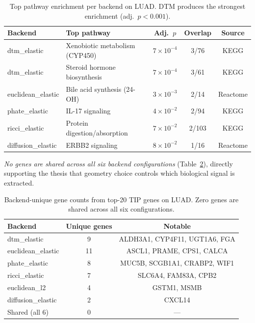 \documentclass[12pt]{article}
\begin{document}
\begin{table}[h]
\centering\small
\begin{tabular}{@{}llccc@{}}
\toprule
\textbf{Backend} & \textbf{Top pathway} & \textbf{Adj.\ $p$} & \textbf{Overlap} & \textbf{Source} \\
\midrule
dtm\_elastic & Xenobiotic metabolism (CYP450) & $7 \times 10^{-4}$ & 3/76 & KEGG \\
dtm\_elastic & Steroid hormone biosynthesis & $7 \times 10^{-4}$ & 3/61 & KEGG \\
euclidean\_elastic & Bile acid synthesis (24-OH) & $3 \times 10^{-3}$ & 2/14 & Reactome \\
phate\_elastic & IL-17 signaling & $4 \times 10^{-2}$ & 2/94 & KEGG \\
ricci\_elastic & Protein digestion/absorption & $7 \times 10^{-2}$ & 2/103 & KEGG \\
diffusion\_elastic & ERBB2 signaling & $8 \times 10^{-2}$ & 1/16 & Reactome \\
\bottomrule
\end{tabular}
\caption{Top pathway enrichment per backend on LUAD. DTM produces the strongest enrichment (adj.\ $p < 0.001$).}
\label{tab:enrichment}
\end{table}

\emph{No genes are shared across all six backend configurations} (Table~\ref{tab:geneoverlap}), directly supporting the thesis that geometry choice controls which biological signal is extracted.

\begin{table}[h]
\centering\small
\begin{tabular}{lcc}
\toprule
\textbf{Backend} & \textbf{Unique genes} & \textbf{Notable} \\
\midrule
dtm\_elastic & 9 & ALDH3A1, CYP4F11, UGT1A6, FGA \\
euclidean\_elastic & 11 & ASCL1, PRAME, CPS1, CALCA \\
phate\_elastic & 8 & MUC5B, SCGB1A1, CRABP2, WIF1 \\
ricci\_elastic & 7 & SLC6A4, FAM83A, CPB2 \\
euclidean\_l2 & 4 & GSTM1, MSMB \\
diffusion\_elastic & 2 & CXCL14 \\
\midrule
Shared (all 6) & 0 & --- \\
\bottomrule
\end{tabular}
\caption{Backend-unique gene counts from top-20 TIP genes on LUAD. Zero genes are shared across all six configurations.}
\label{tab:geneoverlap}
\end{table}
\end{document}
